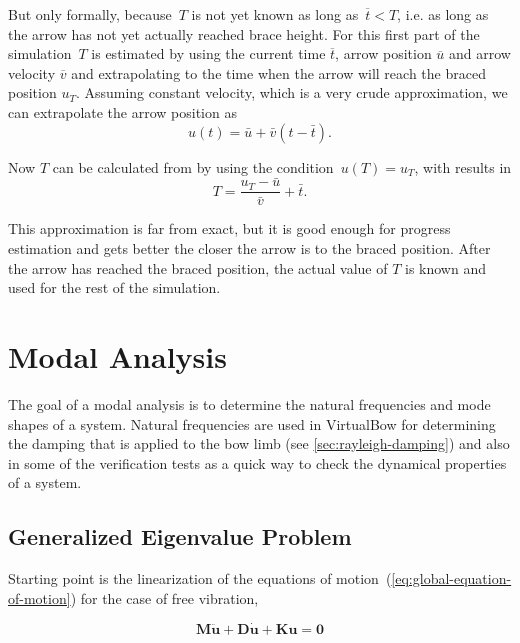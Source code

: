 But only formally, because~$T$ is not yet known as long as~$\overline{t} < T$, i.e. as long as the arrow has not yet actually reached brace height.
For this first part of the simulation~$T$ is estimated by using the current time $\overline{t}$, arrow position $\overline{u}$ and arrow velocity $\overline{v}$ and extrapolating to the time when the arrow will reach the braced position $u_T$.
Assuming constant velocity, which is a very crude approximation, we can extrapolate the arrow position as
\begin{equation}
u(t) = \bar{u} + \bar{v}(t - \bar{t}).\label{eq:solution:progress:ansatz}
\end{equation}

Now $T$ can be calculated from by using the condition~$u(T) = u_T$, with results in
\begin{equation}
T = \frac{u_T - \bar{u}}{\bar{v}} + \bar{t}.
\end{equation}

This approximation is far from exact, but it is good enough for progress estimation and gets better the closer the arrow is to the braced position.
After the arrow has reached the braced position, the actual value of $T$ is known and used for the rest of the simulation.

\newpage
\section{Modal Analysis}

The goal of a modal analysis is to determine the natural frequencies and mode shapes of a system.
Natural frequencies are used in VirtualBow for determining the damping that is applied to the bow limb (see \ref{sec:rayleigh-damping}) and also in some of the verification tests as a quick way to check the dynamical properties of a system.

\subsection{Generalized Eigenvalue Problem}

Starting point is the linearization of the equations of motion~(\ref{eq:global-equation-of-motion}) for the case of free vibration,

\begin{equation}
\boldsymbol{M}\ddot{\boldsymbol{u}} + \boldsymbol{D}\dot{\boldsymbol{u}} + \boldsymbol{K}\boldsymbol{u} = \boldsymbol{0} \label{eq:solution:ode-linearized}
\end{equation}

